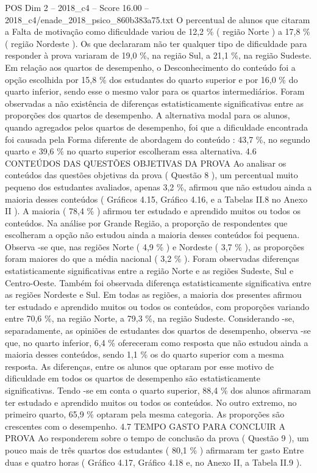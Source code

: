 \begin{textsample}{POS Dim 2 – 2018\_c4 – Score 16.00 – 2018\_c4/enade\_2018\_psico\_860b383a75.txt}
O percentual de alunos que citaram a Falta de motivação como dificuldade variou de 12,2 \% ( região Norte ) a 17,8 \% ( região Nordeste ).
Os que declararam não ter qualquer tipo de dificuldade para responder à prova variaram de 19,0 \%, na região Sul, a 21,1 \%, na região Sudeste.
Em relação aos quartos de desempenho, o Desconhecimento do conteúdo foi a opção escolhida por 15,8 \% dos estudantes do quarto superior e por 16,0 \% do quarto inferior, sendo esse o mesmo valor para os quartos intermediários.
Foram observadas a não existência de diferenças estatisticamente significativas entre as proporções dos quartos de desempenho.
A alternativa modal para os alunos, quando agregados pelos quartos de desempenho, foi que a dificuldade encontrada foi causada pela Forma diferente de abordagem do conteúdo : 43,7 \%, no segundo quarto e 39,6 \% no quarto superior escolheram essa alternativa. 4.6 CONTEÚDOS DAS QUESTÕES OBJETIVAS DA PROVA Ao analisar os conteúdos das questões objetivas da prova ( Questão 8 ), um percentual muito pequeno dos estudantes avaliados, apenas 3,2 \%, afirmou que não estudou ainda a maioria desses conteúdos ( Gráficos 4.15, Gráfico 4.16, e a Tabelas II.8 no Anexo II ).
A maioria ( 78,4 \% ) afirmou ter estudado e aprendido muitos ou todos os conteúdos.
Na análise por Grande Região, a proporção de respondentes que escolheram a opção não estudou ainda a maioria desses conteúdos foi pequena.
Observa -se que, nas regiões Norte ( 4,9 \% ) e Nordeste ( 3,7 \% ), as proporções foram maiores do que a média nacional ( 3,2 \% ).
Foram observadas diferenças estatisticamente significativas entre a região Norte e as regiões Sudeste, Sul e Centro-Oeste.
Também foi observada diferença estatisticamente significativa entre as regiões Nordeste e Sul.
Em todas as regiões, a maioria dos presentes afirmou ter estudado e aprendido muitos ou todos os conteúdos, com proporções variando entre 70,6 \%, na região Norte, a 79,3 \%, na região Sudeste.
Considerando -se, separadamente, as opiniões de estudantes dos quartos de desempenho, observa -se que, no quarto inferior, 6,4 \% ofereceram como resposta que não estudou ainda a maioria desses conteúdos, sendo 1,1 \% os do quarto superior com a mesma resposta.
As diferenças, entre os alunos que optaram por esse motivo de dificuldade em todos os quartos de desempenho são estatisticamente significativas.
Tendo -se em conta o quarto superior, 88,4 \% dos alunos afirmaram ter estudado e aprendido muitos ou todos os conteúdos.
No outro extremo, no primeiro quarto, 65,9 \% optaram pela mesma categoria.
As proporções são crescentes com o desempenho. 4.7 TEMPO GASTO PARA CONCLUIR A PROVA Ao responderem sobre o tempo de conclusão da prova ( Questão 9 ), um pouco mais de três quartos dos estudantes ( 80,1 \% ) afirmaram ter gasto Entre duas e quatro horas ( Gráfico 4.17, Gráfico 4.18 e, no Anexo II, a Tabela II.9 ).

\end{textsample}
